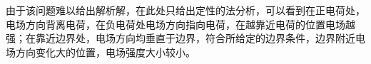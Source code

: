\documentclass{article} %
\begin{document}
由于该问题难以给出解析解，在此处只给出定性的法分析，可以看到在正电荷处，电场方向背离电荷，在负电荷处电场方向指向电荷，在越靠近电荷的位置电场越强；在靠近边界处，电场方向均垂直于边界，符合所给定的边界条件，边界附近电场方向变化大的位置，电场强度大小较小。
\begin{figure}[ht]
    \begin{center}
        \\

\end{center}
\end{figure}
\end{document}
